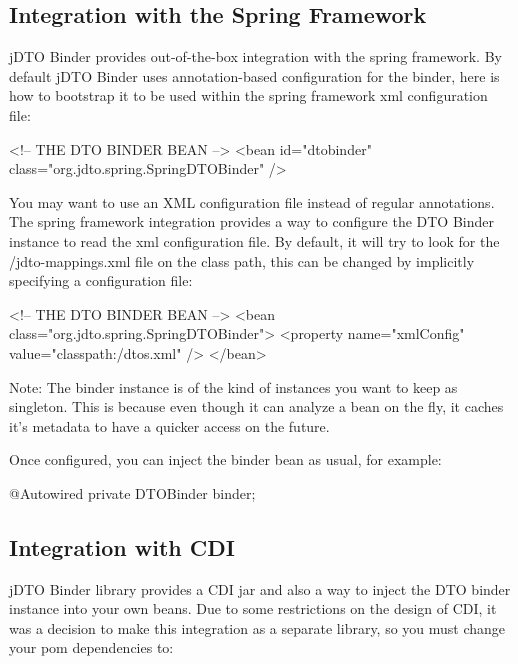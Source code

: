 \documentclass[11pt]{article}
\newcommand{\JDTO}{jDTO Binder\xspace}
\newcommand{\DEFAULTCONFIG}{/jdto-mappings.xml\xspace}
\begin{document}
\subsection{Integration with the Spring Framework}

\JDTO provides out-of-the-box integration with the spring framework. By default \JDTO uses annotation-based configuration for the binder, here is how to bootstrap it to be used within the spring framework xml configuration file:


\begin{xml}
<!-- THE DTO BINDER BEAN --> 
<bean id="dtobinder" 
    class="org.jdto.spring.SpringDTOBinder" />
\end{xml}


You may want to use an XML configuration file instead of regular annotations. The spring framework integration
provides a way to configure the DTO Binder instance to read the xml configuration file. By default, it will try to look for the \DEFAULTCONFIG file on the class path, this can be changed by implicitly specifying a configuration file:


\begin{xml}
<!-- THE DTO BINDER BEAN --> 
<bean class="org.jdto.spring.SpringDTOBinder">
    <property name="xmlConfig" value="classpath:/dtos.xml" />
</bean>
\end{xml}


Note: The binder instance is of the kind of instances you want to keep as singleton. This is because even though it can analyze a bean on the fly, it caches it's metadata to have a quicker access on the future.

Once configured, you can inject the binder bean as usual, for example:


\begin{java}
@Autowired
private DTOBinder binder;
\end{java}

\subsection{Integration with CDI}

\JDTO library provides a CDI jar and also a way to inject the DTO binder instance into your own beans. Due to some restrictions on the design of CDI, it was a decision to make this integration as a separate library, so you must change your pom dependencies to:

\end{document}
